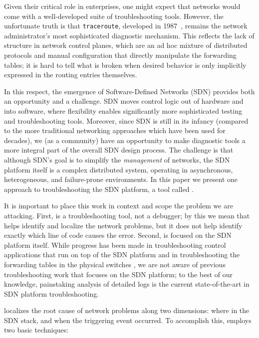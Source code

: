 Given their critical role in enterprises, one might expect that networks
would come with a well-developed suite of troubleshooting tools. However,
the unfortunate truth is that {\tt traceroute}, developed in 1987~\cite{traceroute},
remains the network administrator's most sophisticated diagnostic mechanism. This reflects
the lack of structure in network control planes, which are an ad hoc mixture of
distributed protocols and manual configuration that directly manipulate the forwarding tables; it is hard to tell what is broken
when desired behavior is only implicitly expressed in the routing entries themselves.

In this respect, the emergence of Software-Defined
Networks (SDN) provides both an opportunity and a challenge. SDN moves control logic out of hardware and into software, where
flexibility enables significantly more sophisticated testing and troubleshooting tools. Moreover, since SDN
is still in its infancy (compared to the more traditional networking approaches which have been
used for decades), we (as a community) have an opportunity to make diagnostic tools
a more integral part of the overall SDN design process. The challenge is that although SDN's goal is to simplify the
{\em management} of networks, the SDN platform itself is a complex distributed system, operating in asynchronous, heterogeneous, and failure-prone environments.
In this paper we present one approach to troubleshooting the SDN platform, a tool called \projectname{}.

It is important to place this work in context and scope the problem we are attacking.  First, \projectname{} is a troubleshooting tool, not a debugger; by this we mean that \projectname{} helps identify and localize the network problems, but it does not help  identify exactly which line of code causes the error. Second, \projectname{} is focused on the SDN platform itself. While progress has been made in troubleshooting control
applications that run on top of the SDN platform \cite{nice} and in troubleshooting the forwarding tables in the physical switches \cite{anteater,hsa}, we  
are not aware of previous troubleshooting work that focuses on the SDN platform; to the best of our knowledge, painstaking analysis of detailed logs is the current state-of-the-art in SDN platform troubleshooting. 

\projectname{} localizes the root cause
of network problems along two dimensions: where in the SDN stack, and when the triggering event occurred. To accomplish this, 
\projectname{} employs two basic techniques:

